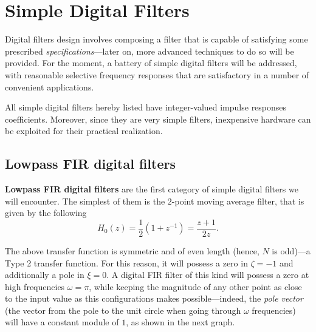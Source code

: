 \documentclass[\documentfontsize, twocolumn]{\classname}
\begin{document}
\chapter{Simple Digital Filters}

Digital filters design involves composing a filter that is capable of satisfying some prescribed \emph{specifications}---later on, more advanced techniques to do so will be provided. For the moment, a battery of simple digital filters will be addressed, with reasonable selective frequency responses that are satisfactory in a number of convenient applications.

All simple digital filters hereby listed have integer-valued impulse responses coefficients. Moreover, since they are very simple filters, inexpensive hardware can be exploited for their practical realization.

\section{Lowpass FIR digital filters}

\textbf{Lowpass FIR digital filters} are the first category of simple digital filters we will encounter. The simplest of them is the $2$-point moving average filter, that is given by the following
\begin{equation}\label{eqn:twoPointMovingAverageFilterFIRLowpass}
    H_0(z) = \frac 1 2 \left(1 + z^{-1}\right) = \frac {z+1} {2z}.
\end{equation}

The above transfer function is symmetric and of even length (hence, $N$ is odd)---a Type 2 transfer function. For this reason, it will possess a zero in $\zeta=-1$ and additionally a pole in $\xi = 0$. A digital FIR filter of this kind will possess a zero at high frequencies $\omega = \pi$, while keeping the magnitude of any other point as close to the input value as this configurations makes possible---indeed, the \emph{pole vector} (the vector from the pole to the unit circle when going through $\omega$ frequencies) will have a constant module of $1$, as shown in the next graph.
\end{document}
